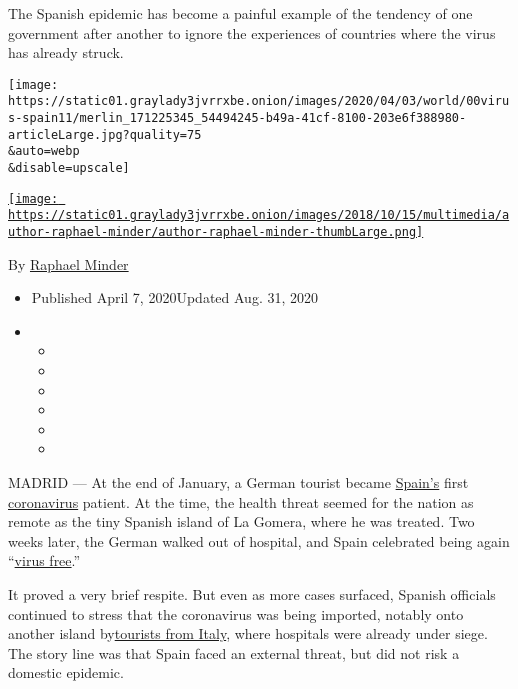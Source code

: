 The Spanish epidemic has become a painful example of the tendency of one
government after another to ignore the experiences of countries where
the virus has already struck.

\texttt{[image: https://static01.graylady3jvrrxbe.onion/images/2020/04/03/world/00virus-spain11/merlin\_171225345\_54494245-b49a-41cf-8100-203e6f388980-articleLarge.jpg?quality=75\\\&auto=webp\\\&disable=upscale]}

\href{https://www.nytimes3xbfgragh.onion/by/raphael-minder}{\texttt{[image: https://static01.graylady3jvrrxbe.onion/images/2018/10/15/multimedia/author-raphael-minder/author-raphael-minder-thumbLarge.png]}}

By \href{https://www.nytimes3xbfgragh.onion/by/raphael-minder}{Raphael
Minder}

\begin{itemize}
\item
  Published April 7, 2020Updated Aug. 31, 2020
\item
  \begin{itemize}
  \item
  \item
  \item
  \item
  \item
  \item
  \end{itemize}
\end{itemize}

MADRID --- At the end of January, a German tourist became
\href{https://www.nytimes3xbfgragh.onion/2020/08/31/world/europe/coronavirus-covid-spain-second-wave.html}{Spain's}
first
\href{https://www.nytimes3xbfgragh.onion/2020/07/23/world/europe/spain-coronavirus-reopening.html}{coronavirus}
patient. At the time, the health threat seemed for the nation as remote
as the tiny Spanish island of La Gomera, where he was treated. Two weeks
later, the German walked out of hospital, and Spain celebrated being
again
``\href{https://www.lavanguardia.com/vida/20200215/473560105026/espana-coronavirus-libre-alta-casos-registrados.html}{virus
free}.''

It proved a very brief respite. But even as more cases surfaced, Spanish
officials continued to stress that the coronavirus was being imported,
notably onto another island
by\href{https://www.nytimes3xbfgragh.onion/2020/02/26/world/europe/spain-coronavirus.html}{tourists
from Italy}, where hospitals were already under siege. The story line
was that Spain faced an external threat, but did not risk a domestic
epidemic.

